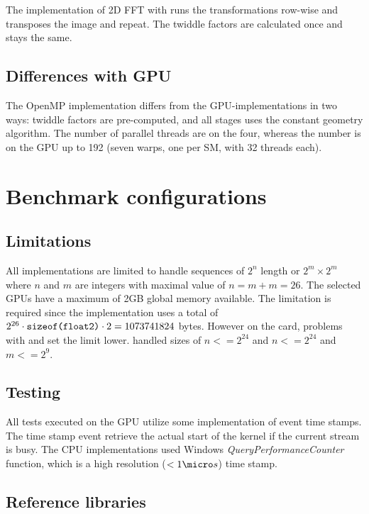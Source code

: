The implementation of \gls{2D} \gls{FFT} with {\OMP} runs the transformations row-wise and transposes the image and repeat. The twiddle factors are calculated once and stays the same.

\subsection{Differences with GPU}

The OpenMP implementation differs from the \gls{GPU}-implementations in two ways: twiddle factors are pre-computed, and all stages uses the constant geometry algorithm. The number of parallel threads are on the {\INTELCPU} four, whereas the number is on the \gls{GPU} up to 192 (seven warps, one per \gls{SM}, with 32 threads each).

\section{Benchmark configurations}

\subsection{Limitations}

All implementations are limited to handle sequences of $2^n$ length or $2^m \times 2^m$ where $n$ and $m$ are integers with maximal value of $n = m + m = 26$. The selected \gls{GPU}s have a maximum of 2GB global memory available. The limitation is required since the implementation uses a total of $2^{26} \cdot \texttt{sizeof(float2)} \cdot 2 = 1073741824$ bytes. However on the {\AMDCARD} card, problems with {\DX} and {\GL} set the limit lower. {\DX} handled sizes of $n <= 2^{24}$ and {\GL} $n <= 2^{24}$ and $m <= 2^{9}$.

\subsection{Testing}

All tests executed on the \gls{GPU} utilize some implementation of event time stamps. The time stamp event retrieve the actual start of the kernel if the current stream is busy. The \gls{CPU} implementations used Windows \emph{QueryPerformanceCounter} function, which is a high resolution ($<1{\micro}s$) time stamp.

\subsection{Reference libraries}

